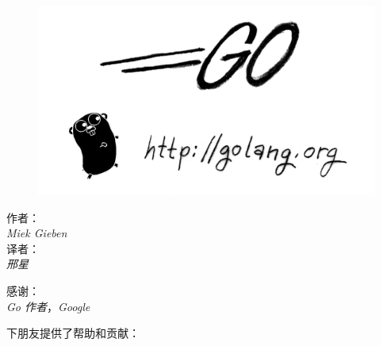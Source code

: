\documentclass[a4paper,twoside,openleft]{blocksbook}
\begin{document}
\begin{cjkc}
\thispagestyle{empty}
\newcommand{\version}{1.0}
\begin{center}
\\
\vspace{0.5cm}
{}
\end{center}
\vspace*{0.5cm}
\begin{figure}[h!]
\begin{center}
    \includegraphics[scale=0.65]{fig/bumper-inverse.png}
\end{center}
\end{figure}
\vspace*{0.02\stockheight}
\begin{minipage}{0.4\textwidth}
\begin{flushleft} \large
\hspace*{2,0cm}作者：\\
\hspace*{2.0cm}\emph{Miek Gieben}\\
\hspace*{2.0cm}译者：\\
\hspace*{2.0cm}\emph{邢星}\\
\vfill
\end{flushleft}
\end{minipage}
\hspace{5mm}
\begin{minipage}{0.4\textwidth}
\begin{flushright} \large
感谢：\\
\emph{Go 作者}，\emph{Google}\\
\vfill
\end{flushright}
\end{minipage}
\vspace*{0.5cm}
\begin{center}
下朋友提供了帮助和贡献：


\end{center}
\end{cjkc}
\end{document}
